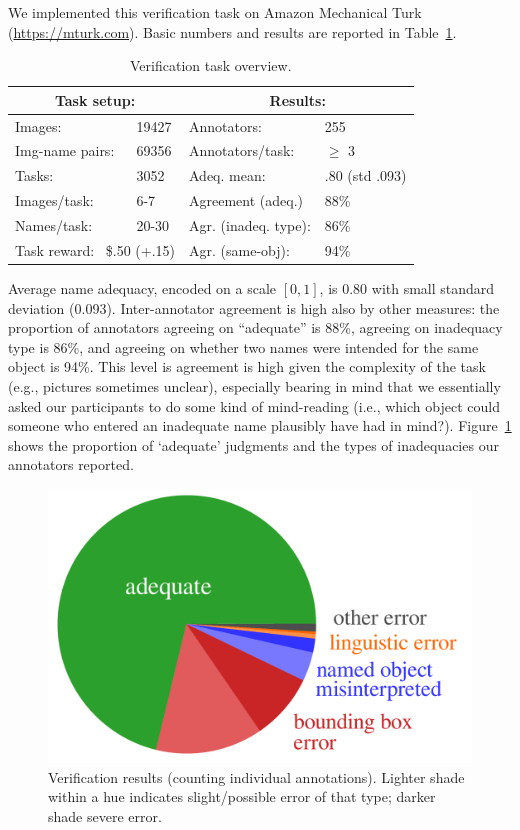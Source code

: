 We implemented this verification task on Amazon Mechanical Turk (\url{https://mturk.com}). 
Basic numbers and results are reported in Table~\ref{tab:verification-numbers}.
\begin{table}[t]
	\centering
	\small
	\begin{tabular}{|ll|ll|}
		\hline
		\multicolumn{2}{|c|}{\textbf{Task setup:}} & \multicolumn{2}{c|}{\textbf{Results:}} \\ \hline
		Images: & 19427 &
			Annotators: & 255 \\
		Img-name pairs: & 69356 &
			Annotators/task: & $\geq$ 3 \\
		Tasks: & 3052 &
			Adeq. mean: & \hspace{-3em}.80 (std .093)\\
		Images/task: & 6-7 &			
			Agreement (adeq.) & 88\% \\ 
		Names/task: & 20-30 &
			Agr. (inadeq. type): & 86\% \\
		\multicolumn{2}{|l|}{Task reward: \ \$.50 (+.15)} & 
			Agr. (same-obj): & 94\% \\
		\hline
	\end{tabular}
	\caption{Verification task overview.}
	\label{tab:verification-numbers}
\end{table}
Average name adequacy, encoded on a scale $[0,1]$, is 0.80 with small standard deviation (0.093). 
Inter-annotator agreement is high also by other measures: the proportion of annotators agreeing on ``adequate'' is 88\%, agreeing on inadequacy type is 86\%, and agreeing on whether two names were intended for the same object is 94\%.
This level is agreement is high given the complexity of the task (e.g., pictures sometimes unclear), especially bearing in mind that we essentially asked our participants to do some kind of mind-reading (i.e., which object could someone who entered an inadequate name plausibly have had in mind?).
Figure~\ref{fig:verification-piechart} shows the proportion of `adequate' judgments and the types of inadequacies our annotators reported.
\begin{figure}[t]
	\centering
	\hspace*{.2\columnwidth}\includegraphics[width=.7\columnwidth]{images/verification_piechart.pdf}
	\caption{Verification results (counting individual annotations). Lighter shade within a hue indicates slight/possible error of that type; darker shade severe error.}
	\label{fig:verification-piechart}
\end{figure}


